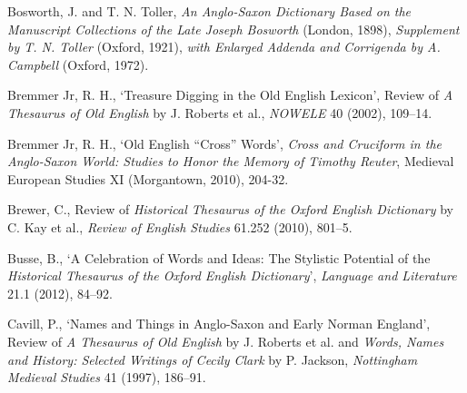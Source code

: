 \begin{list}{}
\item %
Bosworth, J. and T. N. Toller, \textit{An Anglo-Saxon Dictionary Based on the Manuscript Collections of the Late Joseph Bosworth} (London, 1898), \textit{Supplement by T. N. Toller} (Oxford, 1921), \textit{with Enlarged Addenda and Corrigenda by A. Campbell} (Oxford, 1972).

\item %
Bremmer Jr, R. H., `Treasure Digging in the Old English Lexicon', Review of \textit{A Thesaurus of Old English} by J. Roberts et al., \textit{NOWELE} 40 (2002), 109–14.


\item %
Bremmer Jr, R. H., `Old English ``Cross'' Words', \textit{Cross and Cruciform in the Anglo-Saxon World: Studies to Honor the Memory of Timothy Reuter}, Medieval European Studies XI (Morgantown, 2010), 204-32.


\item %
Brewer, C., Review of \textit{Historical Thesaurus of the Oxford English Dictionary} by C. Kay et al., \textit{Review of English Studies} 61.252 (2010), 801–5.

\item %
Busse, B., `A Celebration of Words and Ideas: The Stylistic Potential of the \textit{Historical Thesaurus of the Oxford English Dictionary}', \textit{Language and Literature} 21.1 (2012), 84–92. 

\item %
Cavill, P., `Names and Things in Anglo-Saxon and Early Norman England', Review of \textit{A Thesaurus of Old English} by J. Roberts et al. and \textit{Words, Names and History: Selected Writings of Cecily Clark} by P. Jackson, \textit{Nottingham Medieval Studies} 41 (1997), 186–91.


\end{list}
